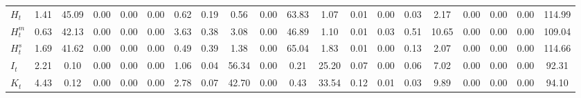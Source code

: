 \begin{center}
\begin{longtable}{lccccccccccccccccccc}
$ H_t                       $	 & 	                1.41	 & 	               45.09	 & 	                0.00	 & 	                0.00	 & 	                0.00	 & 	                0.62	 & 	                0.19	 & 	                0.56	 & 	                0.00	 & 	               63.83	 & 	                1.07	 & 	                0.01	 & 	                0.00	 & 	                0.03	 & 	                2.17	 & 	                0.00	 & 	                0.00	 & 	                0.00	 & 	              114.99 \\ 
$ H^m_t                     $	 & 	                0.63	 & 	               42.13	 & 	                0.00	 & 	                0.00	 & 	                0.00	 & 	                3.63	 & 	                0.38	 & 	                3.08	 & 	                0.00	 & 	               46.89	 & 	                1.10	 & 	                0.01	 & 	                0.03	 & 	                0.51	 & 	               10.65	 & 	                0.00	 & 	                0.00	 & 	                0.00	 & 	              109.04 \\ 
$ H^s_t                     $	 & 	                1.69	 & 	               41.62	 & 	                0.00	 & 	                0.00	 & 	                0.00	 & 	                0.49	 & 	                0.39	 & 	                1.38	 & 	                0.00	 & 	               65.04	 & 	                1.83	 & 	                0.01	 & 	                0.00	 & 	                0.13	 & 	                2.07	 & 	                0.00	 & 	                0.00	 & 	                0.00	 & 	              114.66 \\ 
$ I_t                       $	 & 	                2.21	 & 	                0.10	 & 	                0.00	 & 	                0.00	 & 	                0.00	 & 	                1.06	 & 	                0.04	 & 	               56.34	 & 	                0.00	 & 	                0.21	 & 	               25.20	 & 	                0.07	 & 	                0.00	 & 	                0.06	 & 	                7.02	 & 	                0.00	 & 	                0.00	 & 	                0.00	 & 	               92.31 \\ 
$ K_t                       $	 & 	                4.43	 & 	                0.12	 & 	                0.00	 & 	                0.00	 & 	                0.00	 & 	                2.78	 & 	                0.07	 & 	               42.70	 & 	                0.00	 & 	                0.43	 & 	               33.54	 & 	                0.12	 & 	                0.01	 & 	                0.03	 & 	                9.89	 & 	                0.00	 & 	                0.00	 & 	                0.00	 & 	               94.10 \\ 

\end{longtable}
\end{center}
